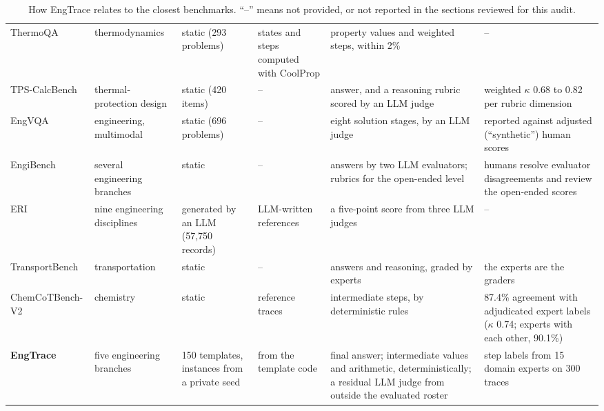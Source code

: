 \begin{table}[t]
\begin{tabular}{p{2.5cm}p{1.9cm}p{2.3cm}p{2.1cm}p{3.4cm}p{3.3cm}}
ThermoQA \citep{duzkar2026thermoqa} & thermodynamics & static (293 problems) & states and steps computed with CoolProp & property values and weighted steps, within 2\% & -- \\
TPS-CalcBench \citep{zheng2026tpscalcbench} & thermal-protection design & static (420 items) & -- & answer, and a reasoning rubric scored by an LLM judge & weighted $\kappa$ 0.68 to 0.82 per rubric dimension \\
EngVQA \citep{wasiq2026engvqa} & engineering, multimodal & static (696 problems) & -- & eight solution stages, by an LLM judge & reported against adjusted (``synthetic'') human scores \\
EngiBench \citep{zhou2025engibench} & several engineering branches & static & -- & answers by two LLM evaluators; rubrics for the open-ended level & humans resolve evaluator disagreements and review the open-ended scores \\
ERI \citep{naser2026eri} & nine engineering disciplines & generated by an LLM (57,750 records) & LLM-written references & a five-point score from three LLM judges & -- \\
TransportBench \citep{syed2024transportbench} & transportation & static & -- & answers and reasoning, graded by experts & the experts are the graders \\
ChemCoTBench-V2 \citep{guo2026chemcotbenchv2} & chemistry & static & reference traces & intermediate steps, by deterministic rules & 87.4\% agreement with adjudicated expert labels ($\kappa$ 0.74; experts with each other, 90.1\%) \\
\textbf{EngTrace} & five engineering branches & 150 templates, instances from a private seed & from the template code & final answer; intermediate values and arithmetic, deterministically; a residual LLM judge from outside the evaluated roster & step labels from 15 domain experts on 300 traces \\
\bottomrule
\end{tabular}
\caption{How EngTrace relates to the closest benchmarks. ``--'' means not provided, or not reported in the sections reviewed for this audit.}
\label{tab:related}
\end{table}
